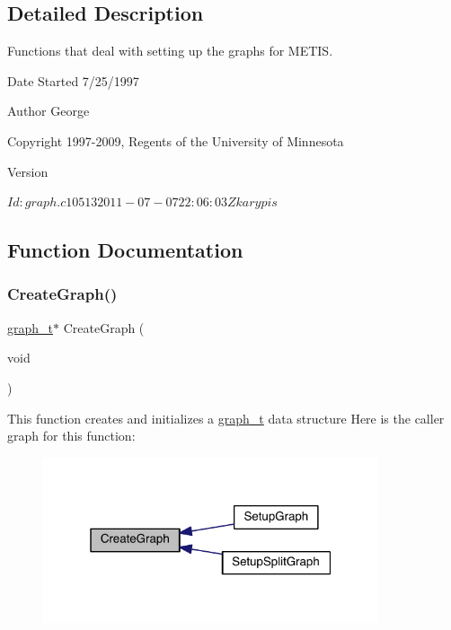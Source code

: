 \subsection{Detailed Description}
Functions that deal with setting up the graphs for M\+E\+T\+IS. 

\begin{DoxyDate}{Date}
Started 7/25/1997 
\end{DoxyDate}
\begin{DoxyAuthor}{Author}
George 

Copyright 1997-\/2009, Regents of the University of Minnesota 
\end{DoxyAuthor}
\begin{DoxyVersion}{Version}
\begin{DoxyVerb}$Id: graph.c 10513 2011-07-07 22:06:03Z karypis $ \end{DoxyVerb}
 
\end{DoxyVersion}


\subsection{Function Documentation}
\mbox{\label{a00849_a01903fa912de9fc7f01dace993a3fc85}} 
\subsubsection{\texorpdfstring{Create\+Graph()}{CreateGraph()}}
{\footnotesize\ttfamily \hyperlink{a00734}{graph\+\_\+t}$\ast$ Create\+Graph (\begin{DoxyParamCaption}\item[{void}]{ }\end{DoxyParamCaption})}

This function creates and initializes a \hyperlink{a00734}{graph\+\_\+t} data structure Here is the caller graph for this function\+:\nopagebreak
\begin{figure}[H]
\begin{center}
\leavevmode
\includegraphics[width=280pt]{a00849_a01903fa912de9fc7f01dace993a3fc85_icgraph}
\end{center}
\end{figure}
\mbox{\label{a00849_a6af2646733e761482dafebbb5e351240}} 
